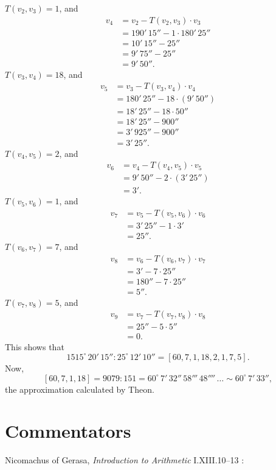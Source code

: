 \documentclass{article}
\begin{document}
$T(v_2,v_3)=1$, and
\begin{align*}
v_4&=v_2-T(v_2,v_3) \cdot v_3\\
&=190' \, 15'' - 1 \cdot 180' \, 25''\\
&=10' \, 15'' - 25''\\
&=9' \, 75'' - 25''\\
&=9' \, 50''.
\end{align*}
$T(v_3,v_4)=18$, and
\begin{align*}
v_5&=v_3-T(v_3,v_4) \cdot v_4\\
&=180' \, 25'' - 18\cdot (9' \, 50'')\\
&=18' \, 25'' - 18\cdot 50''\\
&=18' \, 25'' - 900''\\
&=3' \, 925'' - 900''\\
&=3' \, 25''.
\end{align*}
$T(v_4,v_5)=2$, and
\begin{align*}
v_6&=v_4-T(v_4,v_5) \cdot v_5\\
&=9' \, 50'' - 2 \cdot (3' \, 25'')\\
&=3'.
\end{align*}
$T(v_5,v_6)=1$, and
\begin{align*}
v_7&=v_5-T(v_5,v_6) \cdot v_6\\
&=3' \, 25'' - 1 \cdot 3'\\
&=25''.
\end{align*}
$T(v_6,v_7)=7$, and
\begin{align*}
v_8&=v_6-T(v_6,v_7) \cdot v_7\\
&=3' - 7 \cdot 25''\\
&=180'' - 7\cdot 25''\\
&=5''.
\end{align*}
$T(v_7,v_8)=5$, and
\begin{align*}
v_9&=v_7-T(v_7,v_8) \cdot v_8\\
&=25'' - 5 \cdot 5''\\
&=0.
\end{align*}
This shows that
\[
1515^\circ \, 20' \,15'' : 25^\circ \, 12' \, 10''  = [60,7,1,18,2,1,7,5].
\]
Now,
\[
[60,7,1,18] = 9079:151 = 60^\circ \, 7' \, 32'' \, 58''' \, 48'''' \, \ldots
\sim 60^\circ \, 7' \, 33'',
\]
the approximation calculated by Theon.




\section{Commentators}
Nicomachus of Gerasa, {\em Introduction to Arithmetic}  I.XIII.10--13 \cite[pp.~206--207]{nicomachus}:
\end{document}
